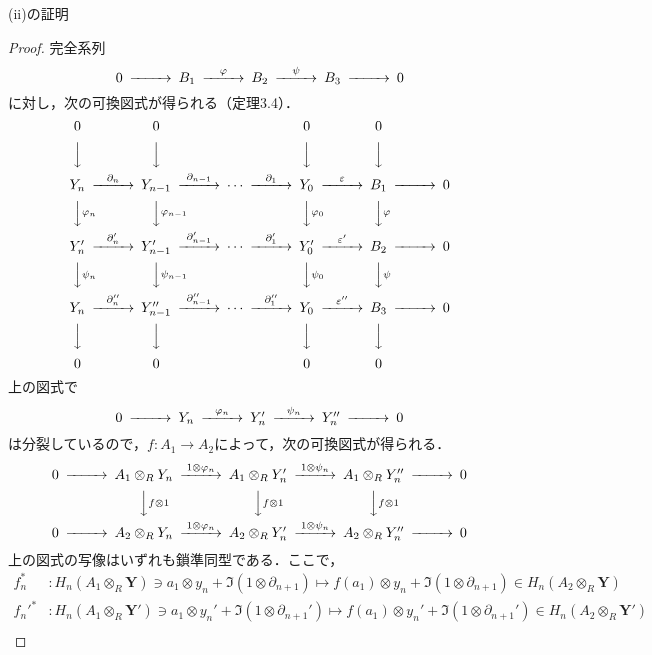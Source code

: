 \begin{screen}
  (ii)の証明
\end{screen}
\begin{proof}
  完全系列
  \[
  \begin{CD}
    0 @>>> B_1 @>{\varphi}>> B_2 @>{\psi}>> B_3 @>>> 0
  \end{CD}
  \]
  に対し，次の可換図式が得られる（定理3.4）．
  \[
  \begin{CD}
    0 @. 0 @. @. 0 @. 0 \\
    @VVV @VVV @. @VVV @VVV \\
    Y_n @>{\partial_n}>> Y_{n-1} @>{\partial_{n-1}}>> \cdots @>{\partial_1}>> Y_0 @>{\varepsilon}>> B_1 @>>> 0 \\
    @VV{\varphi_n}V @VV{\varphi_{n-1}}V @. @VV{\varphi_0}V @VV{\varphi}V \\
    Y_n' @>{\partial_n'}>> Y_{n-1}' @>{\partial_{n-1}'}>> \cdots @>{\partial_1'}>> Y_0' @>{\varepsilon'}>> B_2 @>>> 0 \\
    @VV{\psi_n}V @VV{\psi_{n-1}}V @. @VV{\psi_0}V @VV{\psi}V \\
    Y_n @>{\partial_n''}>> Y_{n-1}'' @>{\partial_{n-1}''}>> \cdots @>{\partial_1''}>> Y_0 @>{\varepsilon''}>> B_3 @>>> 0 \\
    @VVV @VVV @. @VVV @VVV \\
    0 @. 0 @. @. 0 @. 0
  \end{CD}
  \]
  上の図式で
  \[
  \begin{CD}
    0 @>>> Y_n @>{\varphi_n}>> Y_n' @>{\psi_n}>> Y_n'' @>>> 0
  \end{CD}
  \]
  は分裂しているので，$f \colon A_1 \to A_2$によって，次の可換図式が得られる．
  \[
  \begin{CD}
    0 @>>> A_1 \otimes_R Y_n @>{1 \otimes \varphi_n}>> A_1 \otimes_R Y_n' @>{1 \otimes \psi_n}>> A_1 \otimes_R Y_n'' @>>> 0 \\
    @. @VV{f \otimes 1}V @VV{f \otimes 1}V @VV{f \otimes 1}V \\
    0 @>>> A_2 \otimes_R Y_n @>{1 \otimes \varphi_n}>> A_2 \otimes_R Y_n' @>{1 \otimes \psi_n}>> A_2 \otimes_R Y_n'' @>>> 0
  \end{CD}
  \]
  上の図式の写像はいずれも鎖準同型である．ここで，
  \begin{align*}
    f_n^{\ast} & \colon H_n(A_1 \otimes_R \boldsymbol{Y}) \ni a_1 \otimes y_n + \Im (1 \otimes \partial_{n+1}) \mapsto f(a_1) \otimes y_n + \Im (1 \otimes \partial_{n+1}) \in H_n(A_2 \otimes_R \boldsymbol{Y}) \\
    f_n'^{\ast} & \colon H_n(A_1 \otimes_R \boldsymbol{Y}') \ni a_1 \otimes y_n' + \Im (1 \otimes \partial_{n+1}') \mapsto f(a_1) \otimes y_n' + \Im (1 \otimes \partial_{n+1}') \in H_n(A_2 \otimes_R \boldsymbol{Y}') \\

\end{align*}
\end{proof}
